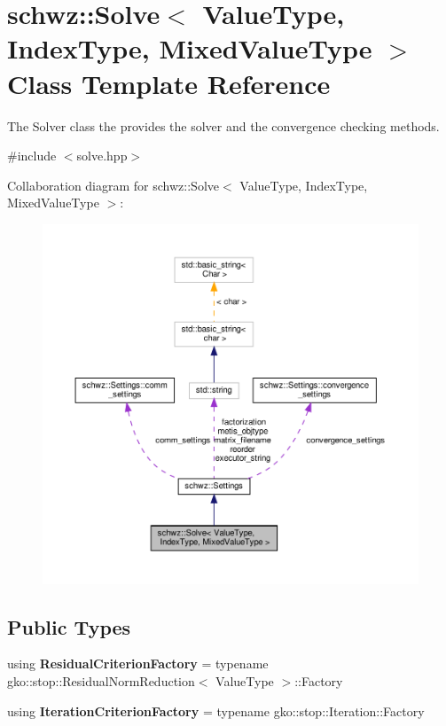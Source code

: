 \hypertarget{classschwz_1_1Solve}{}\section{schwz\+:\+:Solve$<$ Value\+Type, Index\+Type, Mixed\+Value\+Type $>$ Class Template Reference}
\label{classschwz_1_1Solve}


The Solver class the provides the solver and the convergence checking methods.  




{\ttfamily \#include $<$solve.\+hpp$>$}



Collaboration diagram for schwz\+:\+:Solve$<$ Value\+Type, Index\+Type, Mixed\+Value\+Type $>$\+:
\nopagebreak
\begin{figure}[H]
\begin{center}
\leavevmode
\includegraphics[width=350pt]{classschwz_1_1Solve__coll__graph}
\end{center}
\end{figure}
\subsection*{Public Types}
\begin{DoxyCompactItemize}
\item 
\mbox{\label{classschwz_1_1Solve_ac890db489e6dd909e5050f37ab1ba138}} 
using {\bfseries Residual\+Criterion\+Factory} = typename gko\+::stop\+::\+Residual\+Norm\+Reduction$<$ Value\+Type $>$\+::Factory
\item 
\mbox{\label{classschwz_1_1Solve_a7dea24087adbad116841f4f80c1be29b}} 
using {\bfseries Iteration\+Criterion\+Factory} = typename gko\+::stop\+::\+Iteration\+::\+Factory
\end{DoxyCompactItemize}
